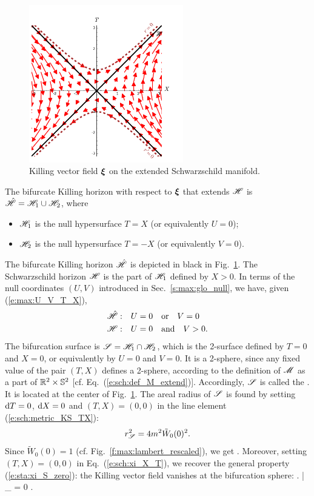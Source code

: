 \begin{figure}
\centerline{\includegraphics[width=0.6\textwidth]{sch_xi_extend.pdf}}
\caption[]{\label{f:sch:xi_extend} \footnotesize
Killing vector field $\bm{\xi}$ on the extended Schwarzschild manifold.}
\end{figure}

The bifurcate Killing horizon with respect to $\bm{\xi}$
that extends $\mathscr{H}$
is $\hat{\mathscr{H}} = \mathscr{H}_1 \cup \mathscr{H}_2 $, where
\begin{itemize}
\item $\mathscr{H}_1$ is the null hypersurface $T=X$ (or equivalently $U=0$);
\item $\mathscr{H}_2$ is the null hypersurface $T=-X$ (or equivalently $V=0$).
\end{itemize}
The bifurcate Killing horizon $\hat{\mathscr{H}}$ is depicted in black in
Fig.~\ref{f:sch:xi_extend}.
The Schwarzschild horizon $\mathscr{H}$ is the part of $\mathscr{H}_1$ defined by $X>0$.
In terms of the null coordinates $(U,V)$ introduced in Sec.~\ref{s:max:glo_null},
we have, given (\ref{e:max:U_V_T_X}),
\begin{subequations}
\label{e:max:Hor_U_V}
\begin{align}
    \hat{\mathscr{H}}:\quad&  U = 0 \quad\mbox{or}\quad V = 0 \\
    \mathscr{H}:\quad &   U = 0 \quad\mbox{and}\quad V > 0 .
\end{align}
\end{subequations}
The bifurcation surface is $\mathscr{S} = \mathscr{H}_1 \cap \mathscr{H}_2$, which
is the 2-surface defined by $T=0$ and $X=0$, or equivalently by
$U=0$ and $V=0$. It is a 2-sphere, since
any fixed value of the pair $(T,X)$ defines a 2-sphere, according to the
definition of $\mathscr{M}$ as a part of $\mathbb{R}^2\times\mathbb{S}^2$
[cf. Eq.~(\ref{e:sch:def_M_extend})]. Accordingly, $\mathscr{S}$ is called the
. It is located at the
center of Fig.~\ref{f:sch:xi_extend}.
The areal radius of $\mathscr{S}$ is found by setting
$\mathrm{d} T = 0$, $\mathrm{d} X = 0$ and $(T,X)=(0,0)$ in the line element
(\ref{e:sch:metric_KS_TX}):
\[
    r_{\mathscr{S}}^2 = 4m^2 \tilde{W}_0(0)^2.
\]
Since $\tilde{W}_0(0)=1$ (cf. Fig.~\ref{f:max:lambert_rescaled}), we get
\be
     .
\ee
Moreover, setting $(T,X)=(0,0)$ in Eq.~(\ref{e:sch:xi_X_T}),
we recover the general property (\ref{e:sta:xi_S_zero}): the Killing
vector field vanishes at the bifurcation sphere:
\be
\left. \w{\xi} \right| _{\Sp} = 0 .
\ee

